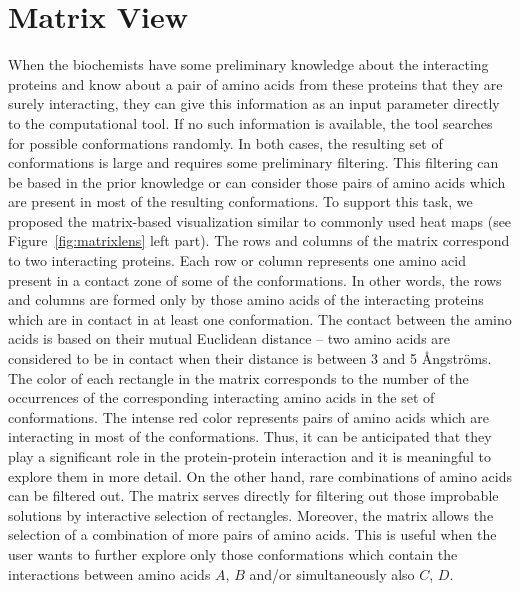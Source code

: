 \documentclass[journal]{vgtc}                %
\begin{document}
\section{Matrix View}
When the biochemists have some preliminary knowledge about the interacting proteins and know about a pair of amino acids from these proteins that they are surely interacting, they can give this information as an input parameter directly to the computational tool.
If no such information is available, the tool searches for possible conformations randomly.
In both cases, the resulting set of conformations is large and requires some preliminary filtering.
This filtering can be based in the prior knowledge or can consider those pairs of amino acids which are present in most of the resulting conformations.
To support this task, we proposed the matrix-based visualization similar to commonly used heat maps (see Figure~\ref{fig:matrixlens} left part).
The rows and columns of the matrix correspond to two interacting proteins.
Each row or column represents one amino acid present in a contact zone of some of the conformations. 
In other words, the rows and columns are formed only by those amino acids of the interacting proteins which are in contact in at least one conformation.
The contact between the amino acids is based on their mutual Euclidean distance -- two amino acids are considered to be in contact when their distance is between 3 and 5 \AA ngstr\"{o}ms.
The color of each rectangle in the matrix corresponds to the number of the occurrences of the corresponding interacting amino acids in the set of conformations. 
The intense red color represents pairs of amino acids which are interacting in most of the conformations.
Thus, it can be anticipated that they play a significant role in the protein-protein interaction and it is meaningful to explore them in more detail.
On the other hand, rare combinations of amino acids can be filtered out.
The matrix serves directly for filtering out those improbable solutions by interactive selection of rectangles.
Moreover, the matrix allows the selection of a combination of more pairs of amino acids.
This is useful when the user wants to further explore only those conformations which contain the interactions between amino acids $A$, $B$ and/or simultaneously also $C$, $D$. 
\end{document}
